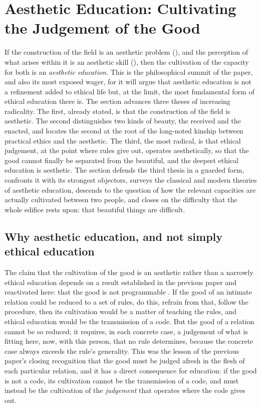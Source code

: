 \section{Aesthetic Education: Cultivating the Judgement of the Good}
\label{p21:sec:aesthetic-education}

\noindent
If the construction of the field is an aesthetic problem (), and the perception of what arises within it is an aesthetic skill (), then the cultivation of the capacity for both is an \emph{aesthetic education}. This is the philosophical summit of the paper, and also its most exposed wager, for it will argue that aesthetic education is not a refinement added to ethical life but, at the limit, the most fundamental form of ethical education there is. The section advances three theses of increasing radicality. The first, already stated, is that the construction of the field is aesthetic. The second distinguishes two kinds of beauty, the received and the enacted, and locates the second at the root of the long-noted kinship between practical ethics and the aesthetic. The third, the most radical, is that ethical judgement, at the point where rules give out, operates aesthetically, so that the good cannot finally be separated from the beautiful, and the deepest ethical education is aesthetic. The section defends the third thesis in a guarded form, confronts it with its strongest objectors, surveys the classical and modern theories of aesthetic education, descends to the question of how the relevant capacities are actually cultivated between two people, and closes on the difficulty that the whole edifice rests upon: that beautiful things are difficult.

\subsection{Why aesthetic education, and not simply ethical education}
\label{p21:sub:ae-why}

The claim that the cultivation of the good is an aesthetic rather than a narrowly ethical education depends on a result established in the previous paper and reactivated here: that the good is not programmable \parencite{paperxx}. If the good of an intimate relation could be reduced to a set of rules, do this, refrain from that, follow the procedure, then its cultivation would be a matter of teaching the rules, and ethical education would be the transmission of a code. But the good of a relation cannot be so reduced; it requires, in each concrete case, a judgement of what is fitting here, now, with this person, that no rule determines, because the concrete case always exceeds the rule's generality. This was the lesson of the previous paper's closing recognition that the good must be judged afresh in the flesh of each particular relation, and it has a direct consequence for education: if the good is not a code, its cultivation cannot be the transmission of a code, and must instead be the cultivation of the \emph{judgement} that operates where the code gives out.

